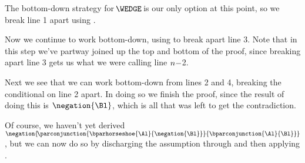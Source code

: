 \noindent{}The bottom-down strategy for $\!\WEDGE\!$ is our only option at this point, so we break line 1 apart using .
\begin{gproof}
\galineNCnd{}{}{}
\galineNCnd{}{$\qquad\vdots$}{}
\galineNCnd{}{}{}
\end{gproof}
\noindent{}Now we continue to work bottom-down, using  to break apart line 3. Note that in this step we've partway joined up the top and bottom of the proof, since breaking apart line 3 gets us what we were calling line $n-$2.
\begin{gproof}
\galineNCnd{}{}{}
\galineNCnd{}{$\qquad\vdots$}{}
\galineNCnd{}{}{}
\end{gproof}
\noindent{}Next we see that we can work bottom-down from lines 2 and 4, breaking the conditional on line 2 apart. In doing so we finish the proof, since the result of doing this is $\negation{\Bl}$, which is all that was left to get the contradiction. 
\begin{gproof}[\label{helpful1}]
\end{gproof}
Of course, we haven't yet derived $\negation{\!\parconjunction{\bparhorseshoe{\Al}{\negation{\Bl}}}{\bparconjunction{\Al}{\Bl}}}$, but we can now do so by discharging the assumption through  and then applying .
